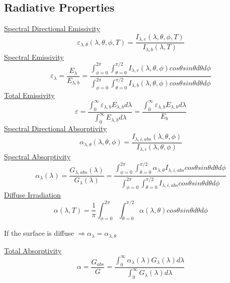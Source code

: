 \documentclass[twocolumn, 12pt]{article}
\begin{document}
\subsection*{Radiative Properties}
\underline{Spectral Directional Emissivity}
\begin{equation*}
    \varepsilon_{\lambda, \theta} (\lambda, \theta, \phi, T) = \frac{I_{\lambda, e} (\lambda, \theta, \phi, T)}{I_{\lambda,b} (\lambda, T)}
\end{equation*}
\underline{Spectral Emissivity}
\begin{equation*}
    \varepsilon_\lambda =\frac{E_\lambda}{E_{\lambda,b}} = \frac{ \int_{\phi=0}^{2\pi} \int_{\theta=0}^{\pi/2} I_{\lambda,e} (\lambda,\theta,\phi) cos \theta sin \theta d\theta d\phi}{\int_{\phi=0}^{2\pi} \int_{\theta=0}^{\pi/2} I_{\lambda,b} (\lambda,\theta,\phi) cos \theta sin \theta d\theta d\phi}
\end{equation*}
\underline{Total Emissivity}
\begin{equation*}
    \varepsilon = \frac{\int_0^\infty \varepsilon_{\lambda,b} E_{\lambda,b} d\lambda}{\int_0^\infty E_{\lambda,b} d\lambda} = \frac{\int_0^\infty \varepsilon_{\lambda,b} E_{\lambda,b} d\lambda}{E_b}
\end{equation*}
\underline{Spectral Directional Absorptivity}
\begin{equation*}
    \alpha_{\lambda,\theta} (\lambda, \theta, \phi) = \frac{I_{\lambda,i,abs} (\lambda, \theta, \phi)}{I_{\lambda,i} (\lambda, \theta, \phi)}
\end{equation*}
\underline{Spectral Absorptivity}
\begin{equation*}
    \alpha_{\lambda}(\lambda) = \frac{G_{\lambda,abs}(\lambda)}{G_{\lambda}(\lambda)} = \frac{\int_{\phi=0}^{2\pi}  \int_{\theta=0}^{\pi/2} \alpha_{\lambda,\theta} I_{\lambda,i,abs}  cos \theta sin \theta d\theta d\phi }{\int_{\phi=0}^{2\pi}  \int_{\theta=0}^{\pi/2}  I_{\lambda,i,abs}  cos \theta sin \theta d\theta d\phi}
\end{equation*}
\underline{Diffuse Irradiation}
\begin{equation*}
    \alpha(\lambda,T) = \frac{1}{\pi} \int_{\phi=0}^{2\pi}  \int_{\theta=0}^{\pi/2} \alpha(\lambda,\theta) cos \theta sin \theta d\theta d\phi
\end{equation*}
\begin{center}
    If the surface is diffuse \(\Longrightarrow \alpha_\lambda = \alpha_{\lambda,\theta}\)
\end{center}
\underline{Total Absorptivity}
\begin{equation*}
    \alpha = \frac{G_{abs} }{G} = \frac{\int_0^\infty \alpha_\lambda (\lambda) G_\lambda (\lambda) d\lambda}{\int_0^\infty G_\lambda(\lambda) d\lambda}
\end{equation*}
\end{document}
